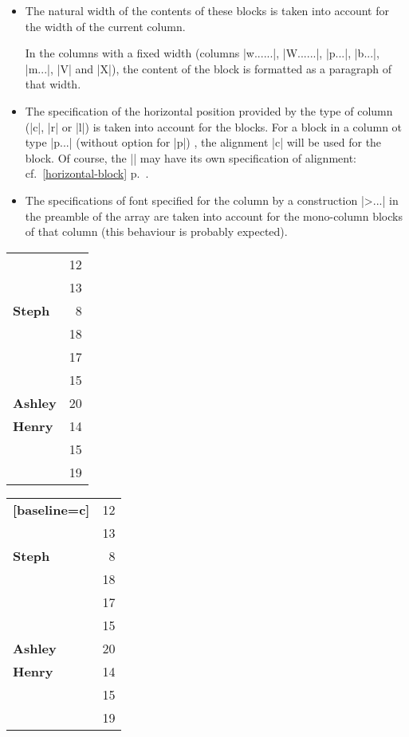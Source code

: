 \documentclass[dvipsnames]{article}%
\begin{document}
\begin{itemize}
\item The natural width of the contents of these blocks is taken into account
for the width of the current column.

In the columns with a fixed width (columns |w{...}{...}|, |W{...}{...}|,
|p{...}|, |b{...}|, |m{...}|, |V| and |X|), the content of the block is
formatted as a paragraph of that width.

\item The specification of the horizontal position provided by the type of
column (|c|, |r| or |l|) is taken into account for the blocks. For a block in a
column ot type |p{...}| (without option for |p|) , the alignment |c| will be
used for the block. Of course, the |\Block| may have its own specification of
alignment: cf.~\ref{horizontal-block} p.~\pageref{horizontal-block}.

\item The specifications of font specified for the column by a construction
|>{...}| in the preamble of the array are taken into account for the
mono-column blocks of that column (this behaviour is probably expected).
\end{itemize}


\bigskip
\begin{scope}
\hfuzz=10cm
\begin{Code}[width=12cm]
\begin{NiceTabular}{@{}>{\bfseries}lr@{}} \hline
{}    & 12 \\
                     & 13 \\ \hline
Steph                &  8 \\ \hline
{}   & 18 \\
                     & 17 \\
                     & 15 \\ \hline
Ashley               & 20 \\ \hline
Henry                & 14 \\ \hline
{} & 15 \\
                     & 19 \\ \hline
\end{NiceTabular}
\end{Code}
\begin{NiceTabular}{@{}>{\bfseries}lr@{}}[baseline=c] \hline
{}    & 12 \\
                     & 13 \\ \hline
Steph                &  8 \\ \hline
{}   & 18 \\
                     & 17 \\
                     & 15 \\ \hline
Ashley               & 20 \\ \hline
Henry                & 14 \\ \hline
{} & 15 \\
                     & 19 \\ \hline
\end{NiceTabular}
\end{scope}
\end{document}
